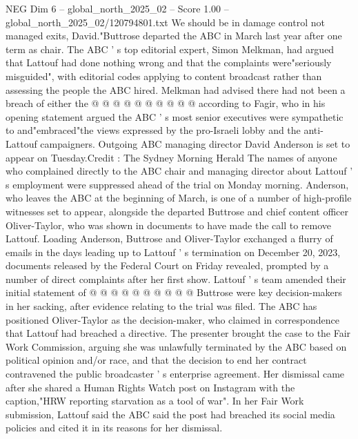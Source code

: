 \begin{textsample}{NEG Dim 6 – global\_north\_2025\_02 – Score 1.00 – global\_north\_2025\_02/120794801.txt}
We should be in damage control not managed exits, David."Buttrose departed the ABC in March last year after one term as chair.
The ABC ' s top editorial expert, Simon Melkman, had argued that Lattouf had done nothing wrong and that the complaints were"seriously misguided", with editorial codes applying to content broadcast rather than assessing the people the ABC hired.
Melkman had advised there had not been a breach of either the @ @ @ @ @ @ @ @ @ @ according to Fagir, who in his opening statement argued the ABC ' s most senior executives were sympathetic to and"embraced"the views expressed by the pro-Israeli lobby and the anti-Lattouf campaigners.
Outgoing ABC managing director David Anderson is set to appear on Tuesday.Credit : The Sydney Morning Herald The names of anyone who complained directly to the ABC chair and managing director about Lattouf ' s employment were suppressed ahead of the trial on Monday morning.
Anderson, who leaves the ABC at the beginning of March, is one of a number of high-profile witnesses set to appear, alongside the departed Buttrose and chief content officer Oliver-Taylor, who was shown in documents to have made the call to remove Lattouf.
Loading Anderson, Buttrose and Oliver-Taylor exchanged a flurry of emails in the days leading up to Lattouf ' s termination on December 20, 2023, documents released by the Federal Court on Friday revealed, prompted by a number of direct complaints after her first show.
Lattouf ' s team amended their initial statement of @ @ @ @ @ @ @ @ @ @ Buttrose were key decision-makers in her sacking, after evidence relating to the trial was filed.
The ABC has positioned Oliver-Taylor as the decision-maker, who claimed in correspondence that Lattouf had breached a directive.
The presenter brought the case to the Fair Work Commission, arguing she was unlawfully terminated by the ABC based on political opinion and/or race, and that the decision to end her contract contravened the public broadcaster ' s enterprise agreement.
Her dismissal came after she shared a Human Rights Watch post on Instagram with the caption,"HRW reporting starvation as a tool of war".
In her Fair Work submission, Lattouf said the ABC said the post had breached its social media policies and cited it in its reasons for her dismissal.

\end{textsample}
